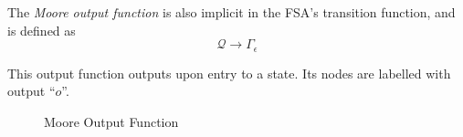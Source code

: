 \begin{definition}
    The \textit{Moore output function} is also implicit in the FSA's transition function, and is defined as
    \begin{equation}
        \mathcal{Q} \to \Gamma_{\epsilon}
    \end{equation}
    
    This output function outputs upon entry to a state. Its nodes are labelled with output \enquote{$o$}.
    
    \begin{figure}[H]
        \centering
        \caption{Moore Output Function}
        \label{fig:fst-moore}
    \end{figure}
\end{definition}
